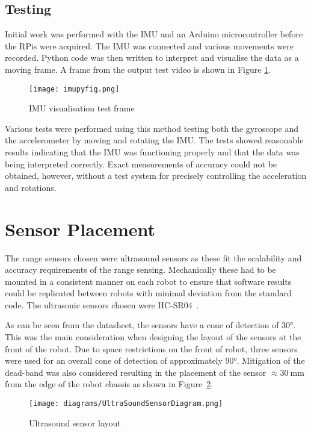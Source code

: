 \subsection{Testing}\label{elec/imu/test}
Initial work was performed with the IMU and an Arduino microcontroller
before the RPis were acquired. The IMU was connected and various
movements were recorded. Python code was then written to interpret and
visualise the data as a moving frame. A frame from the output test video is shown in Figure \ref{fig:imu_py_test}.

\begin{figure}[!hbt]
	\centering
	\texttt{[image: imupyfig.png]}
	\caption{IMU visualisation test frame}\label{fig:imu_py_test}

\end{figure}

Various tests were performed using this method testing both the gyroscope and the
accelerometer by moving and rotating the IMU. The tests showed reasonable results
indicating that the IMU was functioning properly and that the data was being interpreted
correctly. Exact measurements of accuracy could not be obtained, however, without a test
system for precisely controlling the acceleration and rotations.

\section{Sensor Placement}\label{mech/sensors}
The range sensors chosen were ultrasound sensors as these fit the
scalability and accuracy requirements of the range sensing. 
Mechanically these had to be mounted in a consistent manner on each 
robot to ensure that software results could be replicated between 
robots with minimal deviation from the standard code. The ultrasonic 
sensors chosen were HC-SR04~\cite{HCSR04datasheet}.

As can be seen from the datasheet, the sensors have a cone of 
detection of \ang{30}. This was the main consideration when designing 
the layout of the sensors at the front of the robot. Due to space 
restrictions on the front of robot, three sensors were used for an 
overall cone of detection of approximately \ang{90}. Mitigation of the dead-band was also considered resulting in the placement of
the sensor $\approx{\SI{30}{\mm}}$ from the edge of the robot chassis as shown in Figure~\ref{UltraSoundSensorDiagram}. 

\begin{figure}[!ht]
	\centering
	\texttt{[image: diagrams/UltraSoundSensorDiagram.png]}
	\caption{Ultrasound sensor layout}\label{UltraSoundSensorDiagram}

\end{figure}
 
